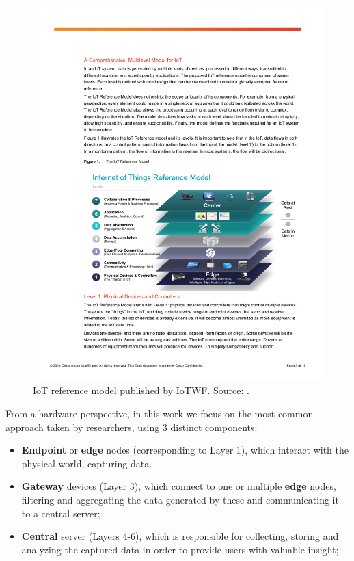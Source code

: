 
\begin{figure}[H]
    \centering
    \includegraphics[width=\linewidth]{images/IoT_Reference_Model.pdf}
    \caption[IoT reference model published by IoTWF.]{IoT reference model published by IoTWF. Source: \cite{Cisco2014}.}
    \label{fig:iotwf-referencemodel}
\end{figure}

From a hardware perspective, in this work we focus on the most common approach taken by researchers, using 3 distinct components: 

\begin{itemize}
    \item \textbf{Endpoint} or \textbf{edge} nodes (corresponding to Layer 1), which interact with the physical world, capturing data.
    \item \textbf{Gateway} devices (Layer 3), which connect to one or multiple \textbf{edge} nodes, filtering and aggregating the data generated by these and communicating it to a central server; 
    \item \textbf{Central} server (Layers 4-6), which is responsible for collecting, storing and analyzing the captured data in order to provide users with valuable insight;
\end{itemize}

